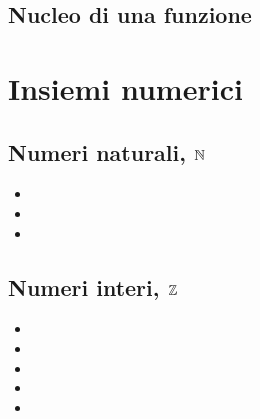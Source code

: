\documentclass[letterpaper,10pt,italian]{jupyterBook}
\begin{document}
\subsection{Nucleo di una funzione}
\label{\detokenize{ch/set:nucleo-di-una-funzione}}\label{\detokenize{ch/set:math-hs-fun-null}}

\section{Insiemi numerici}
\label{\detokenize{ch/set:insiemi-numerici}}\label{\detokenize{ch/set:math-hs-set-numbers}}

\subsection{Numeri naturali, \protect\(\mathbb{N}\protect\)}
\label{\detokenize{ch/set:numeri-naturali-mathbb-n}}\label{\detokenize{ch/set:math-hs-set-numbers-n}}\begin{itemize}
\item {} 
\sphinxAtStartPar
{}

\item {} 
\sphinxAtStartPar
{}

\item {} 
\sphinxAtStartPar
{}

\end{itemize}


\subsection{Numeri interi, \protect\(\mathbb{Z}\protect\)}
\label{\detokenize{ch/set:numeri-interi-mathbb-z}}\label{\detokenize{ch/set:math-hs-set-numbers-z}}\begin{itemize}
\item {} 
\sphinxAtStartPar
{}

\item {} 
\sphinxAtStartPar
{}

\item {} 
\sphinxAtStartPar
{}

\item {} 
\sphinxAtStartPar
{}

\item {} 
\sphinxAtStartPar
{}

\end{itemize}
\end{document}
